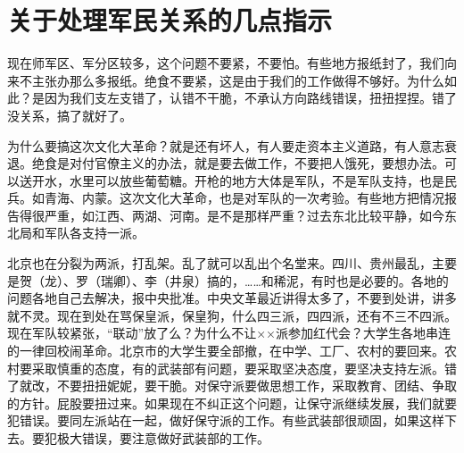 \section[关于处理军民关系的几点指示（一九六七年五月）]{关于处理军民关系的几点指示}


现在师军区、军分区较多，这个问题不要紧，不要怕。有些地方报纸封了，我们向来不主张办那么多报纸。绝食不要紧，这是由于我们的工作做得不够好。为什么如此？是因为我们支左支错了，认错不干脆，不承认方向路线错误，扭扭捏捏。错了没关系，搞了就好了。

为什么要搞这次文化大革命？就是还有坏人，有人要走资本主义道路，有人意志衰退。绝食是对付官僚主义的办法，就是要去做工作，不要把人饿死，要想办法。可以送开水，水里可以放些葡萄糖。开枪的地方大体是军队，不是军队支持，也是民兵。如青海、内蒙。这次文化大革命，也是对军队的一次考验。有些地方把情况报告得很严重，如江西、两湖、河南。是不是那样严重？过去东北比较平静，如今东北局和军队各支持一派。

北京也在分裂为两派，打乱架。乱了就可以乱出个名堂来。四川、贵州最乱，主要是贺（龙）、罗（瑞卿）、李（井泉）搞的，……和稀泥，有时也是必要的。各地的问题各地自己去解决，报中央批准。中央文革最近讲得太多了，不要到处讲，讲多就不灵。现在到处在骂保皇派，保皇狗，什么四三派，四四派，还有不三不四派。现在军队较紧张，“联动”放了么？为什么不让××派参加红代会？大学生各地串连的一律回校闹革命。北京市的大学生要全部撤，在中学、工厂、农村的要回来。农村要采取慎重的态度，有的武装部有问题，要采取坚决态度，要坚决支持左派。错了就改，不要扭扭妮妮，要干脆。对保守派要做思想工作，采取教育、团结、争取的方针。屁股要扭过来。如果现在不纠正这个问题，让保守派继续发展，我们就要犯错误。要同左派站在一起，做好保守派的工作。有些武装部很顽固，如果这样下去。要犯极大错误，要注意做好武装部的工作。

